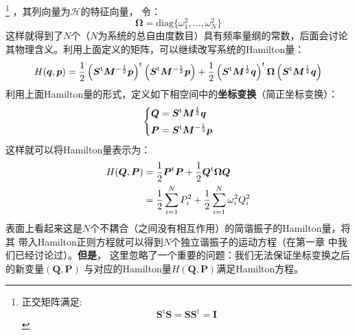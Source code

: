     \footnote{
        正交矩阵满足: 
    \begin{equation}
        \bm{S}^\mathrm{t}\bm{S} = \bm{SS}^\mathrm{t} = \bm{I}
    \end{equation}
    }
    ，其列向量为$\bm{\mathcal{H}}$的特征向量，
    令：
    \begin{equation}
        \bm{\Omega} = \mathrm{diag} \{\omega_1^2, ..., \omega_N^2 \}
    \end{equation}
    这样就得到了$N$个（$N$为系统的总自由度数目）具有频率量纲的常数，后面会讨论
    其物理含义。利用上面定义的矩阵，可以继续改写系统的Hamilton量：
    \begin{equation}
        H(\bm{q},\bm{p}) = \frac{1}{2}\left(\bm{S}^{\mathrm{t}}\bm{M}^{-\frac{1}{2}}\bm{p}\right)^{\mathrm{t}}\left(\bm{S}^{\mathrm{t}}\bm{M}^{-\frac{1}{2}}\bm{p}\right) + 
        \frac{1}{2}\left(\bm{S}^{\mathrm{t}}\bm{M}^{\frac{1}{2}}\bm{q}\right)^{t}\bm{\Omega}\left(\bm{S}^{\mathrm{t}}\bm{M}^{\frac{1}{2}}\bm{q}\right)
    \end{equation}
    利用上面Hamilton量的形式，定义如下相空间中的\textbf{坐标变换}（简正坐标变换）：
    \begin{equation}
        \left\{
        \begin{split}
            \bm{Q} &= \bm{S}^{\mathrm{t}}\bm{M}^{\frac{1}{2}}\bm{q}\\
            \bm{P} &= \bm{S}^{\mathrm{t}}\bm{M}^{-\frac{1}{2}}\bm{p}
        \end{split}
        \right.
        \label{normal mode transformation}
    \end{equation}
    这样就可以将Hamilton量表示为：
    \begin{equation}
        \begin{split}
        H(\bm{Q},\bm{P}) &= \frac{1}{2}\bm{P}^{\mathrm{t}}\bm{P} + \frac{1}{2}\bm{Q}^{\mathrm{t}}\bm{\Omega}\bm{Q}\\
        & = \frac{1}{2}\sum_{i=1}^{N}P_{i}^2 + \frac{1}{2}\sum_{i=1}^{N}\omega_{i}^2Q_{i}^{2}
        \end{split}
    \end{equation}
    表面上看起来这是$N$个不耦合（之间没有相互作用）的简谐振子的Hamilton量，将其
    带入Hamilton正则方程就可以得到$N$个独立谐振子的运动方程（在第一章
    中我们已经讨论过）。\textbf{但是}，
    这里忽略了一个重要的问题：我们无法保证坐标变换之后的新变量$(\bm{Q},\bm{P})$
    与对应的Hamilton量$H(\bm{Q},\bm{P})$满足Hamilton方程。

    \splitline

